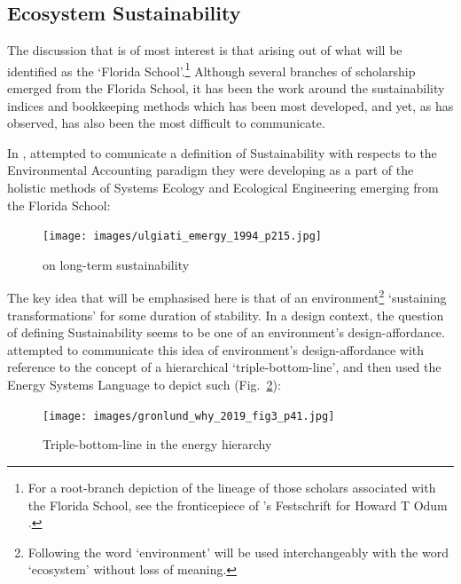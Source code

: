 \subsection{Ecosystem Sustainability}

The discussion that is of most interest is that arising out of what will be identified as the `Florida School'.\footnote{For a root-branch depiction of the lineage of those scholars associated with the Florida School, see the fronticepiece of \citeauthor{hall_maximum_1995}'s Festschrift for Howard T Odum \cite{hall_maximum_1995}.} Although several branches of scholarship emerged from the Florida School, it has been the work around the sustainability indices and bookkeeping methods which has been most developed, and yet, as \citeauthor{gronlund_why_2019} has observed, has also been the most difficult to communicate.

In \citeyear{ulgiati_emergy_1994}, \citeauthor{ulgiati_emergy_1994} attempted to comunicate a definition of Sustainability with respects to the Environmental Accounting paradigm they were developing as a part of the holistic methods of Systems Ecology and Ecological Engineering emerging from the Florida School:

\begin{figure}[H]
    \centering
    \texttt{[image: images/ulgiati\_emergy\_1994\_p215.jpg]}
    \caption{\citet[p.~215]{ulgiati_emergy_1994} on long-term sustainability}
    \label{fig:srinivasan:re}
\end{figure}

The key idea that will be emphasised here is that of an environment\footnote{Following \citet{odum_ecological_1994} the word `environment' will be used interchangeably with the word `ecosystem' without loss of meaning.} `sustaining transformations' for some duration of stability. In a design context, the question of defining Sustainability seems to be one of an environment's design-affordance.  \citeauthor{gronlund_why_2019} attempted to communicate this idea of environment's design-affordance with reference to the concept of a hierarchical `triple-bottom-line', and \citet[Fig.~3, p.~41]{gronlund_why_2019} then used the Energy Systems Language to depict such (Fig.~\ref{fig:gronlund:why}):

\begin{figure}[H]
    \centering
    \texttt{[image: images/gronlund\_why\_2019\_fig3\_p41.jpg]}
    \caption{Triple-bottom-line in the energy hierarchy \citet[Fig.~3, p.~41]{gronlund_why_2019}}
    \label{fig:gronlund:why}
\end{figure}

